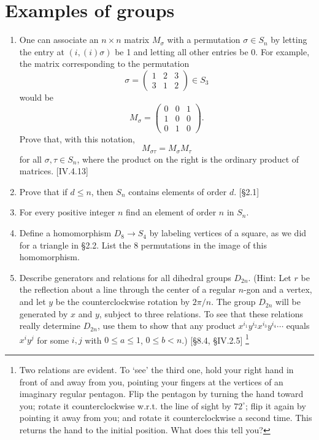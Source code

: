 \section{Examples of groups}
\begin{enumerate}
    \item One can associate an $n \times n$ matrix $M_\sigma$ with a permutation $\sigma \in S_n$ by letting the entry at $(i, (i)\sigma)$ be 1 and letting all other entries be 0. For example, the matrix corresponding to the permutation
          \[ \sigma = \begin{pmatrix} 1 & 2 & 3 \\ 3 & 1 & 2 \end{pmatrix} \in S_3 \]
          would be
          \[ M_\sigma = \begin{pmatrix} 0 & 0 & 1 \\ 1 & 0 & 0 \\ 0 & 1 & 0 \end{pmatrix}. \]
          Prove that, with this notation,
          \[ M_{\sigma\tau} = M_\sigma M_\tau \]
          for all $\sigma, \tau \in S_n$, where the product on the right is the ordinary product of matrices. [IV.4.13]

    \item Prove that if $d \le n$, then $S_n$ contains elements of order $d$. [\S2.1]

    \item For every positive integer $n$ find an element of order $n$ in $S_n$.

    \item Define a homomorphism $D_8 \to S_4$ by labeling vertices of a square, as we did for a triangle in \S2.2. List the 8 permutations in the image of this homomorphism.

    \item Describe generators and relations for all dihedral groups $D_{2n}$. (Hint: Let $r$ be the reflection about a line through the center of a regular $n$-gon and a vertex, and let $y$ be the counterclockwise rotation by $2\pi/n$. The group $D_{2n}$ will be generated by $x$ and $y$, subject to three relations\footnotemark. To see that these relations really determine $D_{2n}$, use them to show that any product $x^{i_1} y^{i_2} x^{i_3} y^{i_4} \cdots$ equals $x^i y^j$ for some $i,j$ with $0 \le a \le 1$, $0 \le b < n$.) [\S8.4, \S IV.2.5]
        \footnote{Two relations are evident. To ‘see’ the third one, hold your right hand in front of and
        away from you, pointing your fingers at the vertices of an imaginary regular pentagon. Flip the
        pentagon by turning the hand toward you; rotate it counterclockwise w.r.t. the line of sight by $72^\circ$; flip it again by pointing it away from you; and rotate it counterclockwise a second time. This
returns the hand to the initial position. What does this tell you?}


\end{enumerate}
